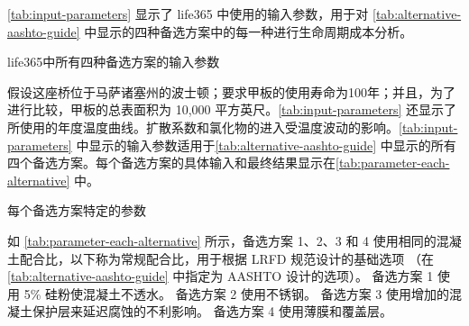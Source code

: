 \cref{tab:input-parameters} 显示了 \gls{life365} 中使用的输入参数，用于对 \cref{tab:alternative-aashto-guide} 中显示的四种备选方案中的每一种进行生命周期成本分析。

\begin{table}
  \caption{\gls{life365}中所有四种备选方案的输入参数}\label{tab:input-parameters}
\end{table}

假设这座桥位于马萨诸塞州的波士顿；要求甲板的使用寿命为100年；并且，为了进行比较，甲板的总表面积为 10,000 平方英尺。\cref{tab:input-parameters} 还显示了所使用的年度温度曲线。扩散系数和氯化物的进入受温度波动的影响。\cref{tab:input-parameters} 中显示的输入参数适用于\cref{tab:alternative-aashto-guide} 中显示的所有四个备选方案。每个备选方案的具体输入和最终结果显示在\cref{tab:parameter-each-alternative} 中。

\begin{table}
  \caption{每个备选方案特定的参数}
  \label{tab:parameter-each-alternative}
\end{table}

如 \cref{tab:parameter-each-alternative} 所示，备选方案 1、2、3 和 4 使用相同的混凝土配合比，以下称为常规配合比，用于根据 LRFD 规范设计的基础选项 （在 \cref{tab:alternative-aashto-guide} 中指定为 AASHTO 设计的选项）。 备选方案 1 使用 5\% 硅粉使混凝土不透水。 备选方案 2 使用不锈钢。 备选方案 3 使用增加的混凝土保护层来延迟腐蚀的不利影响。 备选方案 4 使用薄膜和覆盖层。

